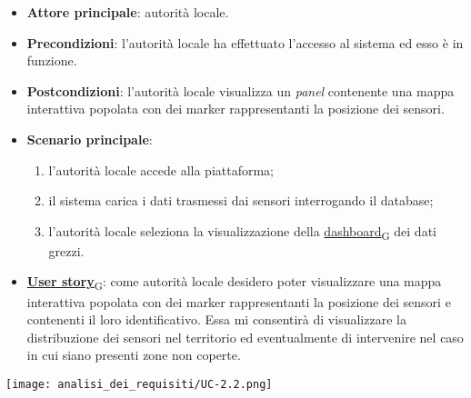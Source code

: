 \begin{itemize}
	\item \textbf{Attore principale}: autorità locale.
	\item \textbf{Precondizioni}: l'autorità locale ha effettuato l'accesso al sistema ed esso è in funzione.
	\item \textbf{Postcondizioni}: l'autorità locale visualizza un \textit{panel} contenente una mappa interattiva
	      popolata con dei marker rappresentanti la posizione dei sensori.
	\item \textbf{Scenario principale}:
	      \begin{enumerate}
		      \item l'autorità locale accede alla piattaforma;
		      \item il sistema carica i dati trasmessi dai sensori interrogando il database;
		      \item l'autorità locale seleziona la visualizzazione della \href{https://7last.github.io/docs/rtb/documentazione-interna/glossario\#dashboard}{dashboard\textsubscript{G}} dei dati grezzi.
	      \end{enumerate}
	\item \href{https://7last.github.io/docs/rtb/documentazione-interna/glossario\#user-story}{\textbf{User story}\textsubscript{G}}: come autorità locale desidero poter visualizzare una mappa interattiva popolata con dei marker rappresentanti
	      la posizione dei sensori e contenenti il loro identificativo. Essa mi consentirà di visualizzare la distribuzione dei sensori nel territorio
	      ed eventualmente di intervenire nel caso in cui siano presenti zone non coperte.
\end{itemize}
\begin{center}
	\texttt{[image: analisi\_dei\_requisiti/UC-2.2.png]}
\end{center}

\newpage

